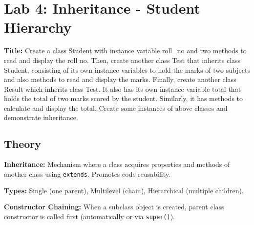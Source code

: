 \documentclass[10pt,a4paper]{article}
\begin{document}
\newpage
\section*{Lab 4: Inheritance - Student Hierarchy}

\textbf{Title:} Create a class Student with instance variable roll\_no and two methods to read and display the roll no. Then, create another class Test that inherits class Student, consisting of its own instance variables to hold the marks of two subjects and also methods to read and display the marks. Finally, create another class Result which inherits class Test. It also has its own instance variable total that holds the total of two marks scored by the student. Similarly, it has methods to calculate and display the total. Create some instances of above classes and demonstrate inheritance.

\subsection*{Theory}
\textbf{Inheritance:} Mechanism where a class acquires properties and methods of another class using \texttt{extends}. Promotes code reusability.

\textbf{Types:} Single (one parent), Multilevel (chain), Hierarchical (multiple children).

\textbf{Constructor Chaining:} When a subclass object is created, parent class constructor is called first (automatically or via \texttt{super()}).
\end{document}
